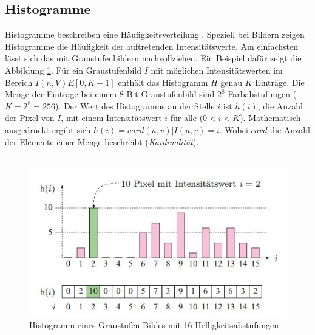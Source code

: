 \subsection{Histogramme}\label{s.histogramme}
Histogramme beschreiben eine Häufigkeitsverteilung \cite[42ff.]{burger2009digitale}. Speziell bei Bildern zeigen Histogramme die Häufigkeit der auftretenden Intensitätswerte. Am einfachsten lässt sich das mit Graustufenbildern nachvollziehen. Ein Beispiel dafür zeigt die Abbildung \ref{img:histogramm}. Für ein Graustufenbild $I$ mit möglichen Intensitätswerten im Bereich $I(n,V)E[0,K-1]$ enthält das Histogramm $H$ genau $K$ Einträge. Die Menge der Einträge bei einem 8-Bit-Graustufenbild sind $2^8$ Farbabstufungen ($K=2^8=256$). Der Wert des Histogramms an der Stelle $i$ ist $h(i)$, die Anzahl der Pixel von $I$, mit einem Intensitätswert $i$ für alle ($0<i<K$). Mathematisch ausgedrückt ergibt sich
 $h(i)=card{(u,v) | I(u,v)=i}$. %
 Wobei $card$ die Anzahl der Elemente einer Menge beschreibt (\textit{Kardinalität}).\\\\
  \begin{figure}
    [h]
    \centering
    \includegraphics[scale=0.8]{Sources/histogramm.jpg}
    \caption{Histogramm eines Graustufen-Bildes mit 16 Helligkeitsabstufungen \cite[42]{burger2009digitale}}
    \label{img:histogramm}
  \end{figure}

